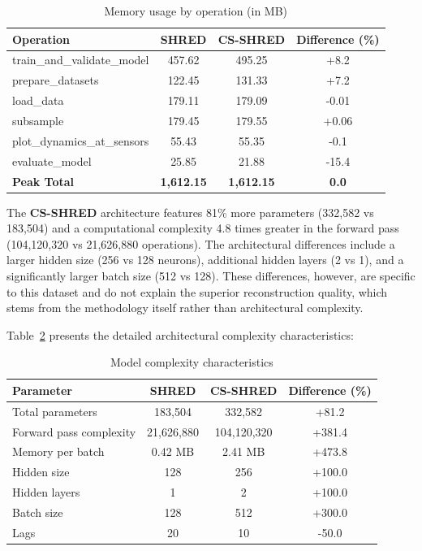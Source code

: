 \begin{table}[h]
\centering
\caption{Memory usage by operation (in MB)}
\label{tab:memory_usage}
\begin{tabular}{|l|c|c|c|}
\hline
\textbf{Operation} & \textbf{SHRED} & \textbf{CS-SHRED} & \textbf{Difference (\%)} \\
\hline
train\_and\_validate\_model & 457.62 & 495.25 & +8.2 \\
prepare\_datasets & 122.45 & 131.33 & +7.2 \\
load\_data & 179.11 & 179.09 & -0.01 \\
subsample & 179.45 & 179.55 & +0.06 \\
plot\_dynamics\_at\_sensors & 55.43 & 55.35 & -0.1 \\
evaluate\_model & 25.85 & 21.88 & -15.4 \\
\hline
\textbf{Peak Total} & \textbf{1,612.15} & \textbf{1,612.15} & \textbf{0.0} \\
\hline
\end{tabular}
\end{table}

The \textbf{CS-SHRED} architecture features 81\% more parameters (332,582 vs 183,504) and a computational complexity 4.8 times greater in the forward pass (104,120,320 vs 21,626,880 operations). The architectural differences include a larger hidden size (256 vs 128 neurons), additional hidden layers (2 vs 1), and a significantly larger batch size (512 vs 128). These differences, however, are specific to this dataset and do not explain the superior reconstruction quality, which stems from the methodology itself rather than architectural complexity.

Table~\ref{tab:model_complexity} presents the detailed architectural complexity characteristics:

\begin{table}[h]
\centering
\caption{Model complexity characteristics}
\label{tab:model_complexity}
\begin{tabular}{|l|c|c|c|}
\hline
\textbf{Parameter} & \textbf{SHRED} & \textbf{CS-SHRED} & \textbf{Difference (\%)} \\
\hline
Total parameters & 183,504 & 332,582 & +81.2 \\
Forward pass complexity & 21,626,880 & 104,120,320 & +381.4 \\
Memory per batch & 0.42 MB & 2.41 MB & +473.8 \\
Hidden size & 128 & 256 & +100.0 \\
Hidden layers & 1 & 2 & +100.0 \\
Batch size & 128 & 512 & +300.0 \\
Lags & 20 & 10 & -50.0 \\
\hline
\end{tabular}
\end{table}

